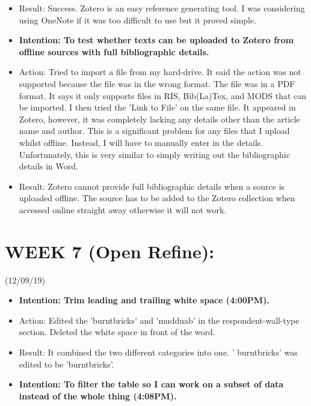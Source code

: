 \documentclass[a4paper,12pt]{article}
\begin{document}
\begin{itemize}
\begin{itemize}
\item Result: Success. Zotero is an easy reference generating tool. I was considering using OneNote if it was too difficult to use but it proved simple.  
    
\item \textbf{Intention: To test whether texts can be uploaded to Zotero from offline sources with full bibliographic details.}

\item Action: Tried to import a file from my hard-drive. It said the action was not supported because the file was in the wrong format. The file was in a PDF format. It says it only supports files in RIS, Bib(La)Tex, and MODS that can be imported. I then tried the 'Link to File' on the same file. It appeared in Zotero, however, it was completely lacking any details other than the article name and author. This is a significant problem for any files that I upload whilst offline. Instead, I will have to manually enter in the details. Unfortunately, this is very similar to simply writing out the bibliographic details in Word. 

\item Result: Zotero cannot provide full bibliographic details when a source is uploaded offline. The source has to be added to the Zotero collection when accessed online straight away otherwise it will not work.

\end{itemize}


\section{WEEK 7 (Open Refine):}

(12/09/19)

\begin{itemize} 


\item \textbf{Intention: Trim leading and trailing white space (4:00PM).}


\item Action: Edited the 'burntbricks' and 'mudduab' in the respondent-wall-type section. Deleted the white space in front of the word. 


\item Result: It combined the two different categories into one. ' burntbricks' was edited to be 'burntbricks'. 


\item \textbf{Intention: To filter the table so I can work on a subset of data instead of the whole thing (4:08PM).}



\end{itemize}
\end{itemize}
\end{document}
